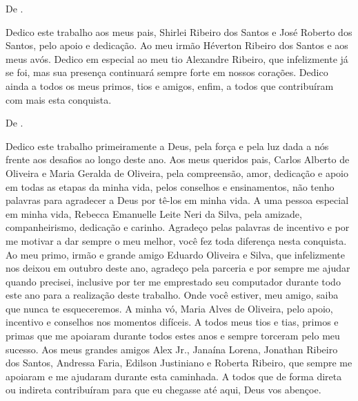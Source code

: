 \begin{dedicatoria}
\vspace*{\fill}
\vspace*{\fill}
\vspace*{\fill}
\vspace*{\fill}
\vspace*{\fill}
\vspace*{\fill}
De \imprimirAutorUm.
\newline
\par Dedico este trabalho aos meus pais, Shirlei Ribeiro dos Santos e José Roberto
dos Santos, pelo apoio e dedicação. Ao meu irmão Héverton Ribeiro dos 
Santos e aos meus avós. Dedico em especial ao meu tio Alexandre Ribeiro, 
que infelizmente já se foi, mas sua presença continuará sempre forte em 
nossos corações. Dedico ainda a todos os meus primos, tios e amigos, enfim, a 
todos que contribuíram com mais esta conquista.

\vspace*{\fill}
De \imprimirAutorDois.
\newline
\par Dedico este trabalho primeiramente a Deus, pela força e pela luz dada a nós 
frente aos desafios ao longo deste ano. Aos meus queridos pais, Carlos Alberto 
de Oliveira e Maria Geralda de Oliveira, pela compreensão, amor, dedicação e 
apoio em todas as etapas da minha vida, pelos conselhos e ensinamentos, não 
tenho palavras para agradecer a Deus por tê-los em minha vida. A uma pessoa 
especial em minha vida, Rebecca Emanuelle Leite Neri da Silva, pela amizade, 
companheirismo, dedicação e carinho. Agradeço pelas palavras de incentivo e 
por me motivar a dar sempre o meu melhor, você fez toda diferença nesta 
conquista. Ao meu primo, irmão e grande amigo Eduardo Oliveira e Silva, que 
infelizmente nos deixou em outubro deste ano, agradeço pela parceria e por 
sempre me ajudar quando precisei, inclusive por ter me emprestado seu 
computador durante todo este ano para a realização deste trabalho. Onde você 
estiver, meu amigo, saiba que nunca te esqueceremos. A minha vó, Maria 
Alves de Oliveira, pelo apoio, incentivo e conselhos nos momentos difíceis. A 
todos meus tios e tias, primos e primas que me apoiaram durante todos estes 
anos e sempre torceram pelo meu sucesso. Aos meus grandes amigos Alex 
Jr., Janaína Lorena, Jonathan Ribeiro dos Santos, Andressa Faria, Edilson 
Justiniano e Roberta Ribeiro, que sempre me apoiaram e me ajudaram durante 
esta caminhada. A todos que de forma direta ou indireta contribuíram para que 
eu chegasse até aqui, Deus vos abençoe.

\end{dedicatoria}
